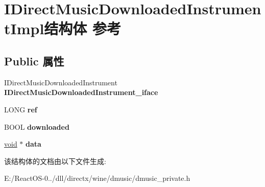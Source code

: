 \hypertarget{struct_i_direct_music_downloaded_instrument_impl}{}\section{I\+Direct\+Music\+Downloaded\+Instrument\+Impl结构体 参考}
\label{struct_i_direct_music_downloaded_instrument_impl}
\subsection*{Public 属性}
\begin{DoxyCompactItemize}
\item 
\mbox{\label{struct_i_direct_music_downloaded_instrument_impl_a6541b431962f353a865bbd5185aa4149}} 
I\+Direct\+Music\+Downloaded\+Instrument {\bfseries I\+Direct\+Music\+Downloaded\+Instrument\+\_\+iface}
\item 
\mbox{\label{struct_i_direct_music_downloaded_instrument_impl_a00fff4e967414cc5770d1d8a2c5f0ed5}} 
L\+O\+NG {\bfseries ref}
\item 
\mbox{\label{struct_i_direct_music_downloaded_instrument_impl_ae9c49707e588296d682096fc3c28c5f7}} 
B\+O\+OL {\bfseries downloaded}
\item 
\mbox{\label{struct_i_direct_music_downloaded_instrument_impl_ab637f41f07db997f9127cf35dd88556d}} 
\hyperlink{interfacevoid}{void} $\ast$ {\bfseries data}
\end{DoxyCompactItemize}


该结构体的文档由以下文件生成\+:\begin{DoxyCompactItemize}
\item 
E\+:/\+React\+O\+S-\/0../dll/directx/wine/dmusic/dmusic\+\_\+private.\+h\end{DoxyCompactItemize}
